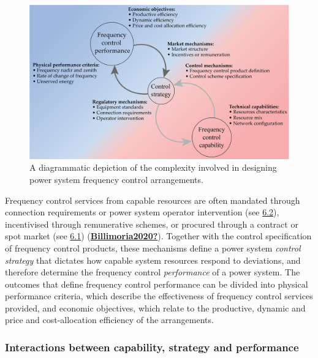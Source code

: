 \documentclass[12pt,a4paper,]{report}
\begin{document}
\begin{figure}
\hypertarget{fig:design_complexity}{%
\centering
\includegraphics{source/figures/capability_performance-04.png}
\caption{A diagrammatic depiction of the complexity involved in
designing power system frequency control
arrangements.}\label{fig:design_complexity}
}
\end{figure}

Frequency control services from capable resources are often mandated
through connection requirements or power system operator intervention
(see \protect\hyperlink{sec:regulatory_mech}{6.2}), incentivised through
remunerative schemes, or procured through a contract or spot market (see
\protect\hyperlink{sec:market_mech}{6.1})
(\protect\hyperlink{ref-Billimoria2020}{\textbf{Billimoria2020?}}).
Together with the control specification of frequency control products,
these mechanisms define a power system \emph{control strategy} that
dictates how capable system resources respond to deviations, and
therefore determine the frequency control \emph{performance} of a power
system. The outcomes that define frequency control performance can be
divided into physical performance criteria, which describe the
effectiveness of frequency control services provided, and economic
objectives, which relate to the productive, dynamic and price and
cost-allocation efficiency of the arrangements.

\hypertarget{interactions-between-capability-strategy-and-performance}{%
\subsubsection{Interactions between capability, strategy and
performance}\label{interactions-between-capability-strategy-and-performance}}
\end{document}
